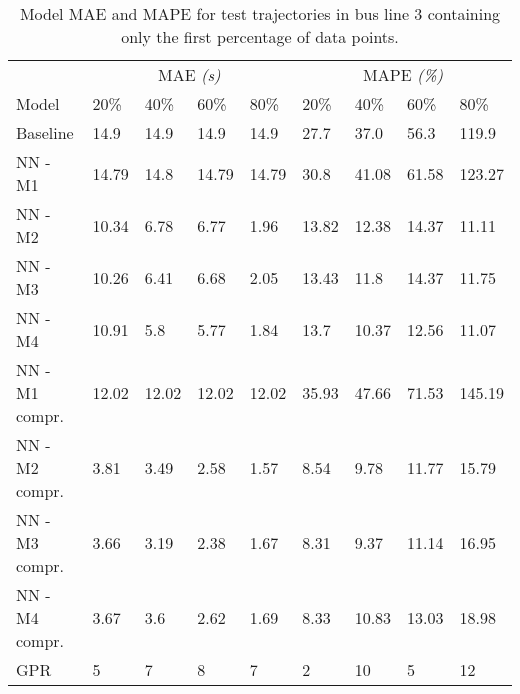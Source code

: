 \begin{table}[H]
  \centering
  \caption{Model MAE and MAPE for test trajectories in bus line 3 containing only the first percentage of data points.}
  \label{tbl:models-mae-and-mape-203}
  \begin{tabular}{l | l | l | l | l || l | l | l | l }
    & \multicolumn{4}{c}{MAE \textit{(s)}} & \multicolumn{4}{c}{MAPE \textit{(\%)}} \\
    Model      & 20\% & 40\% & 60\% & 80\% & 20\% & 40\% & 60\% & 80\% \\
    \hline
    Baseline & 14.9 & 14.9 & 14.9 & 14.9  & 27.7 & 37.0 & 56.3 & 119.9 \\
    NN - M1        & 14.79& 14.8& 14.79& 14.79& 30.8& 41.08& 61.58& 123.27 \\
    NN - M2        & 10.34& 6.78& 6.77& 1.96& 13.82& 12.38& 14.37& 11.11 \\
    NN - M3       & 10.26& 6.41& 6.68& 2.05& 13.43& 11.8& 14.37& 11.75\\
    NN - M4        & 10.91& 5.8& 5.77& 1.84& 13.7& 10.37& 12.56& 11.07 \\
    NN - M1 compr.       & 12.02& 12.02& 12.02& 12.02& 35.93& 47.66& 71.53& 145.19 \\
    NN - M2 compr.       & 3.81& 3.49& 2.58& 1.57& 8.54& 9.78& 11.77& 15.79 \\
    NN - M3 compr.       & 3.66& 3.19& 2.38& 1.67& 8.31& 9.37& 11.14& 16.95 \\
    NN - M4 compr.       & 3.67& 3.6& 2.62& 1.69& 8.33& 10.83& 13.03& 18.98 \\
    GPR        & 5 &  7 & 8 &  7  & 2 & 10 & 5 & 12 \\
  \end{tabular}
\end{table}

